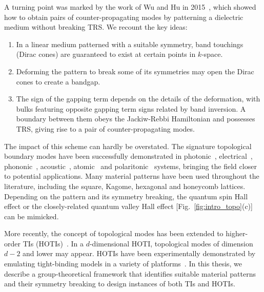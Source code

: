 A turning point was marked by the work of Wu and Hu in 2015~\cite{Wu_Hu_2015}, which showed how to obtain pairs of counter-propagating modes by patterning a dielectric medium without breaking TRS. We recount the key ideas:%
%
\begin{enumerate}

	\item In a linear medium patterned with a suitable symmetry, band touchings (Dirac cones) are guaranteed to exist at certain points in $k$-space.

	\item Deforming the pattern to break some of its symmetries may open the Dirac cones to create a bandgap.

	\item The sign of the gapping term depends on the details of the deformation, with bulks featuring opposite gapping term signs related by band inversion. A boundary between them obeys the Jackiw-Rebbi Hamiltonian and possesses TRS, giving rise to a pair of counter-propagating modes.

\end{enumerate}
%
The impact of this scheme can hardly be overstated. The signature topological boundary modes have been successfully demonstrated in photonic~\cite{Li_2018, Ozawa_2019}, electrical~\cite{Ningyuan_2015, Hofmann_2019}, phononic~\cite{Nash_2015,  Mousavi_2015, Huber_2016}, acoustic~\cite{He_2016, Ma_2019}, atomic~\cite{Cooper_2019} and polaritonic~\cite{Milicevic_2015} systems, bringing the field closer to potential applications. Many material patterns have been used throughout the literature, including the square, Kagome, hexagonal and honeycomb lattices. Depending on the pattern and its symmetry breaking, the quantum spin Hall effect or the closely-related quantum valley Hall effect [Fig.~\ref{fig:intro_topo}(c)] can be mimicked. 

More recently, the concept of topological modes has been extended to higher-order TIs (HOTIs)~\cite{Kraus_2013,Benalcazar_2017a,Benalcazar_2017b,Petrides_2018, Zilberberg_2018, Benalcazar_2019, Calugaru_2019, Fukui_2019, Petrides_2020}. In a $d$-dimensional HOTI, topological modes of dimension $d-2$ and lower may appear. HOTIs have been experimentally demonstrated by emulating tight-binding models in a variety of platforms~\cite{Imhof_2018, Noh_2018, Schindler_2018, Serra-Garcia_2018, Fan_2019, Xue_2019, Xie_2018, Zhang_2019, Zhang_2020, Zhou_2020}. In this thesis, we describe a group-theoretical framework that identifies suitable material patterns and their symmetry breaking to design instances of both TIs and HOTIs. 

